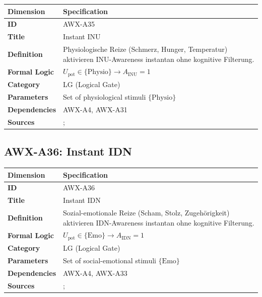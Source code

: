\begin{table}[htbp]
\small
\begin{tabular}{p{3cm}p{11cm}}
\toprule
\textbf{Dimension} & \textbf{Specification} \\
\midrule
\textbf{ID} & AWX-A35 \\
\textbf{Title} & Instant INU \\
\textbf{Definition} & Physiologische Reize (Schmerz, Hunger, Temperatur) aktivieren INU-Awareness instantan ohne kognitive Filterung. \\
\textbf{Formal Logic} & $U_{\text{pot}} \in \{\text{Physio}\} \rightarrow A_{\text{INU}} = 1$ \\
\textbf{Category} & LG (Logical Gate) \\
\textbf{Parameters} & Set of physiological stimuli $\{\text{Physio}\}$ \\
\textbf{Dependencies} & AWX-A4, AWX-A31 \\
\textbf{Sources} & \citet{loewenstein2001risk}; \citet{kahneman2003maps} \\
\bottomrule
\end{tabular}
\end{table}


\subsection{AWX-A36: Instant IDN}

\begin{table}[htbp]
\small
\begin{tabular}{p{3cm}p{11cm}}
\toprule
\textbf{Dimension} & \textbf{Specification} \\
\midrule
\textbf{ID} & AWX-A36 \\
\textbf{Title} & Instant IDN \\
\textbf{Definition} & Sozial-emotionale Reize (Scham, Stolz, Zugehörigkeit) aktivieren IDN-Awareness instantan ohne kognitive Filterung. \\
\textbf{Formal Logic} & $U_{\text{pot}} \in \{\text{Emo}\} \rightarrow A_{\text{IDN}} = 1$ \\
\textbf{Category} & LG (Logical Gate) \\
\textbf{Parameters} & Set of social-emotional stimuli $\{\text{Emo}\}$ \\
\textbf{Dependencies} & AWX-A4, AWX-A33 \\
\textbf{Sources} & \citet{akerlof2000identity}; \citet{elster1998emotions} \\
\bottomrule
\end{tabular}
\end{table}


